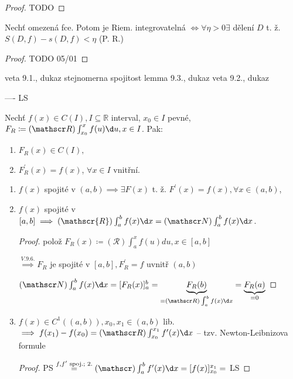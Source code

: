 \begin{proof}
  TODO
\end{proof}

\begin{lemma}[9.2]
  Nechť omezená fce. Potom je Riem. integrovatelná $\iff \forall \eta > 0 \exists$ dělení $D$ t. ž. $S(D, f) - s(D, f) < \eta$ (P. R.)
\end{lemma}

\begin{proof}
  TODO 05/01
\end{proof}

veta 9.1., dukaz
stejnomerna spojitost
lemma 9.3., dukaz
veta 9.2., dukaz

---- LS

\begin{veta}
  Nechť $f(x) \in C(I), I\subseteq \mathbb R$ interval, $x_0 \in I$ pevné, $F_R \coloneq (\mathscr R) \int_{x_0}^x f(u) \d u, x\in I$. Pak:
  \begin{enumerate}
    \item $F_{R}(x) \in C(I),$
    \item $F_{R}^\prime(x) = f(x)$, $\forall x \in I$ vnitřní.
  \end{enumerate}
\end{veta}

\begin{dusledek}
  \begin{enumerate}
    \item $f(x)$ spojité v $(a,b) \implies \exists F(x)$ t. ž. $F^\prime(x) = f(x), \forall x \in (a, b)$,
    \item $f(x)$ spojité v $[a, b] \implies (\mathscr{R}) \int_{a}^{b} f(x) \d x = (\mathscr N) \int_a^b f(x) \d x$.

    \begin{proof}
      polož $F_R(x)\coloneq\left(\mathscr{R}\right)\int_a^x f(u)du, x\in[a,b]$

      $ \stackrel{V. 9. 6.}{\implies} F_R$ je spojité v $[a, b], F_{R}^\prime = f$ uvnitř $(a,b)$

      $(\mathscr N) \int_a^b f(x) \d x = [F_R(x)]_a^b = \underbrace{F_R(b)}_{=(\mathscr R) \int_a^b f(x) \d x} = \underbrace{F_R(a)}_{=0}$
    \end{proof}

    \item $f(x) \in C^1((a,b)), x_0, x_1 \in (a,b)$ lib. $\implies f(x_1) - f(x_0) = (\mathscr R) \int_{x_0}^{x_1} f^\prime (x) \d x$ -- tzv. Newton-Leibnizova formule

    \begin{proof}
      PS $\stackrel{f, f^\prime \text{ spoj.; 2.}}{=} (\mathscr) \int_a^b f^\prime (x) \d x = [f(x)]_{x_0}^{x_1} =$ LS
    \end{proof}
  \end{enumerate}
\end{dusledek}

